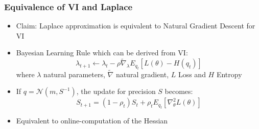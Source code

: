 \documentclass{beamer}
\begin{document}
        \begin{frame}
            \frametitle{Equivalence of VI and Laplace}
            \begin{itemize}
                \item Claim: Laplace approximation is equivalent to Natural Gradient Descent for VI
                \item Bayesian Learning Rule which can be derived from VI:     
                    \begin{equation}
                        \lambda_{t+1} \leftarrow \lambda_{t} - \rho \tilde{\nabla}_\lambda E_{q_t}[L(\theta) - H(q_t)]
                    \end{equation}
                    where $\lambda$ natural parameters, $\tilde{\nabla}$ natural gradient, $L$ Loss and $H$ Entropy
                \item If $q = \mathcal{N}(m, S^{-1})$, the update for precision $S$ becomes:
                    \begin{equation}
                        S_{t+1} = (1 - \rho_t) S_t + \rho_t E_{q_t}[\nabla^2_\theta L(\theta)]
                    \end{equation}
                \item Equivalent to online-computation of the Hessian
            \end{itemize}
        \end{frame}
\end{document}
